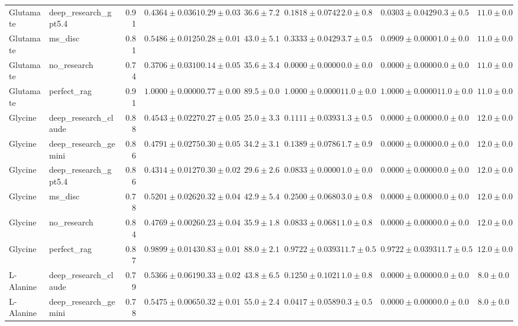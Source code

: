 \begin{table}[htbp]
\begin{tabular}{llrrrrrrrrr}
Glutamate & deep_research_gpt5.4 & 0.91 & $0.4364 \pm 0.0361$ & $0.29 \pm 0.03$ & $36.6 \pm 7.2$ & $0.1818 \pm 0.0742$ & $2.0 \pm 0.8$ & $0.0303 \pm 0.0429$ & $0.3 \pm 0.5$ & $11.0 \pm 0.0$ \\
Glutamate & ms_disc & 0.81 & $0.5486 \pm 0.0125$ & $0.28 \pm 0.01$ & $43.0 \pm 5.1$ & $0.3333 \pm 0.0429$ & $3.7 \pm 0.5$ & $0.0909 \pm 0.0000$ & $1.0 \pm 0.0$ & $11.0 \pm 0.0$ \\
Glutamate & no_research & 0.74 & \cellcolor{red!25}$0.3706 \pm 0.0310$ & $0.14 \pm 0.05$ & $35.6 \pm 3.4$ & $0.0000 \pm 0.0000$ & $0.0 \pm 0.0$ & $0.0000 \pm 0.0000$ & $0.0 \pm 0.0$ & $11.0 \pm 0.0$ \\
Glutamate & perfect_rag & 0.91 & \cellcolor{green!25}$1.0000 \pm 0.0000$ & $0.77 \pm 0.00$ & $89.5 \pm 0.0$ & $1.0000 \pm 0.0000$ & $11.0 \pm 0.0$ & $1.0000 \pm 0.0000$ & $11.0 \pm 0.0$ & $11.0 \pm 0.0$ \\
\midrule
Glycine & deep_research_claude & 0.88 & $0.4543 \pm 0.0227$ & $0.27 \pm 0.05$ & $25.0 \pm 3.3$ & $0.1111 \pm 0.0393$ & $1.3 \pm 0.5$ & $0.0000 \pm 0.0000$ & $0.0 \pm 0.0$ & $12.0 \pm 0.0$ \\
Glycine & deep_research_gemini & 0.86 & $0.4791 \pm 0.0275$ & $0.30 \pm 0.05$ & $34.2 \pm 3.1$ & $0.1389 \pm 0.0786$ & $1.7 \pm 0.9$ & $0.0000 \pm 0.0000$ & $0.0 \pm 0.0$ & $12.0 \pm 0.0$ \\
Glycine & deep_research_gpt5.4 & 0.86 & \cellcolor{red!25}$0.4314 \pm 0.0127$ & $0.30 \pm 0.02$ & $29.6 \pm 2.6$ & $0.0833 \pm 0.0000$ & $1.0 \pm 0.0$ & $0.0000 \pm 0.0000$ & $0.0 \pm 0.0$ & $12.0 \pm 0.0$ \\
Glycine & ms_disc & 0.78 & $0.5201 \pm 0.0262$ & $0.32 \pm 0.04$ & $42.9 \pm 5.4$ & $0.2500 \pm 0.0680$ & $3.0 \pm 0.8$ & $0.0000 \pm 0.0000$ & $0.0 \pm 0.0$ & $12.0 \pm 0.0$ \\
Glycine & no_research & 0.84 & $0.4769 \pm 0.0026$ & $0.23 \pm 0.04$ & $35.9 \pm 1.8$ & $0.0833 \pm 0.0681$ & $1.0 \pm 0.8$ & $0.0000 \pm 0.0000$ & $0.0 \pm 0.0$ & $12.0 \pm 0.0$ \\
Glycine & perfect_rag & 0.87 & \cellcolor{green!25}$0.9899 \pm 0.0143$ & $0.83 \pm 0.01$ & $88.0 \pm 2.1$ & $0.9722 \pm 0.0393$ & $11.7 \pm 0.5$ & $0.9722 \pm 0.0393$ & $11.7 \pm 0.5$ & $12.0 \pm 0.0$ \\
\midrule
L-Alanine & deep_research_claude & 0.79 & $0.5366 \pm 0.0619$ & $0.33 \pm 0.02$ & $43.8 \pm 6.5$ & $0.1250 \pm 0.1021$ & $1.0 \pm 0.8$ & $0.0000 \pm 0.0000$ & $0.0 \pm 0.0$ & $8.0 \pm 0.0$ \\
L-Alanine & deep_research_gemini & 0.78 & $0.5475 \pm 0.0065$ & $0.32 \pm 0.01$ & $55.0 \pm 2.4$ & $0.0417 \pm 0.0589$ & $0.3 \pm 0.5$ & $0.0000 \pm 0.0000$ & $0.0 \pm 0.0$ & $8.0 \pm 0.0$ \\

\end{tabular}
\end{table}
